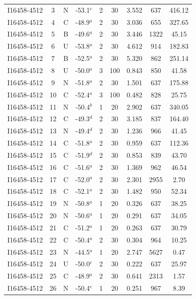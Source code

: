 \begin{table}
\begin{tabular}{ccccccccc}
I16458-4512 & 3 & N & -53.1$^{c}$ & 2 & 30 & 3.552 & 637 & 416.12 \\
I16458-4512 & 4 & C & -48.9$^{a}$ & 2 & 30 & 3.036 & 655 & 327.65 \\
I16458-4512 & 5 & B & -49.6$^{a}$ & 2 & 30 & 3.446 & 1322 & 45.15 \\
I16458-4512 & 6 & U & -53.8$^{a}$ & 2 & 30 & 4.612 & 914 & 182.83 \\
I16458-4512 & 7 & B & -52.5$^{a}$ & 2 & 30 & 5.320 & 862 & 251.14 \\
I16458-4512 & 8 & U & -50.0$^{a}$ & 3 & 100 & 0.843 & 850 & 41.58 \\
I16458-4512 & 9 & N & -51.8$^{a}$ & 2 & 30 & 1.501 & 637 & 175.88 \\
I16458-4512 & 10 & C & -52.4$^{a}$ & 3 & 100 & 0.482 & 828 & 25.75 \\
I16458-4512 & 11 & N & -50.4$^{b}$ & 1 & 20 & 2.902 & 637 & 340.05 \\
I16458-4512 & 12 & C & -49.3$^{d}$ & 2 & 30 & 3.185 & 837 & 164.40 \\
I16458-4512 & 13 & N & -49.4$^{d}$ & 2 & 30 & 1.236 & 966 & 41.45 \\
I16458-4512 & 14 & C & -51.8$^{a}$ & 2 & 30 & 0.959 & 637 & 112.36 \\
I16458-4512 & 15 & C & -51.9$^{d}$ & 2 & 30 & 0.853 & 839 & 43.70 \\
I16458-4512 & 16 & C & -51.6$^{a}$ & 2 & 30 & 1.369 & 962 & 46.54 \\
I16458-4512 & 17 & C & -52.0$^{a}$ & 2 & 30 & 2.301 & 2955 & 2.70 \\
I16458-4512 & 18 & C & -52.1$^{a}$ & 2 & 30 & 1.482 & 950 & 52.34 \\
I16458-4512 & 19 & N & -50.8$^{a}$ & 1 & 20 & 0.326 & 637 & 38.25 \\
I16458-4512 & 20 & N & -50.6$^{a}$ & 1 & 20 & 0.291 & 637 & 34.05 \\
I16458-4512 & 21 & C & -51.2$^{a}$ & 1 & 20 & 0.263 & 637 & 30.79 \\
I16458-4512 & 22 & C & -50.4$^{a}$ & 2 & 30 & 0.304 & 964 & 10.25 \\
I16458-4512 & 23 & N & -44.5$^{a}$ & 1 & 20 & 2.747 & 5627 & 0.47 \\
I16458-4512 & 24 & U & -50.0$^{c}$ & 2 & 30 & 0.222 & 637 & 25.97 \\
I16458-4512 & 25 & C & -48.9$^{a}$ & 2 & 30 & 0.641 & 2313 & 1.57 \\
I16458-4512 & 26 & N & -50.4$^{e}$ & 1 & 20 & 0.251 & 967 & 8.39 \\

\end{tabular}
\end{table}
